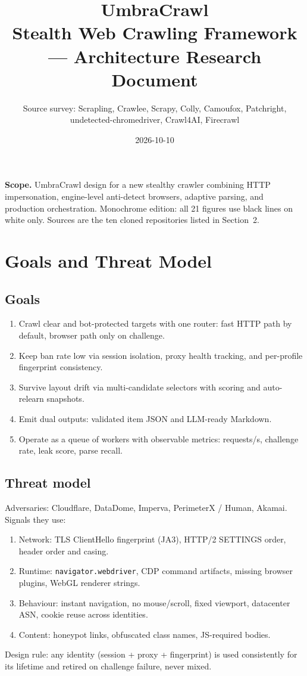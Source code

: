 \documentclass[11pt,a4paper]{article}
\title{UmbraCrawl\\Stealth Web Crawling Framework --- Architecture Research Document}
\author{Source survey: Scrapling, Crawlee, Scrapy, Colly, Camoufox, Patchright, undetected-chromedriver, Crawl4AI, Firecrawl}
\date{2026-10-10}
\begin{document}
\maketitle
\begin{center}
\begin{minipage}{0.92\textwidth}
\small\textbf{Scope.} UmbraCrawl design for a new stealthy crawler combining HTTP impersonation, engine-level anti-detect browsers, adaptive parsing, and production orchestration. Monochrome edition: all 21 figures use black lines on white only. Sources are the ten cloned repositories listed in Section~2.
\end{minipage}
\end{center}
\tableofcontents
\newpage

\section{Goals and Threat Model}
\subsection{Goals}
\begin{enumerate}[leftmargin=*,itemsep=2pt]
\item Crawl clear and bot-protected targets with one router: fast HTTP path by default, browser path only on challenge.
\item Keep ban rate low via session isolation, proxy health tracking, and per-profile fingerprint consistency.
\item Survive layout drift via multi-candidate selectors with scoring and auto-relearn snapshots.
\item Emit dual outputs: validated item JSON and LLM-ready Markdown.
\item Operate as a queue of workers with observable metrics: requests/s, challenge rate, leak score, parse recall.
\end{enumerate}

\subsection{Threat model}
Adversaries: Cloudflare, DataDome, Imperva, PerimeterX / Human, Akamai. Signals they use:
\begin{enumerate}[leftmargin=*,itemsep=2pt]
\item Network: TLS ClientHello fingerprint (JA3), HTTP/2 SETTINGS order, header order and casing.
\item Runtime: \texttt{navigator.webdriver}, CDP command artifacts, missing browser plugins, WebGL renderer strings.
\item Behaviour: instant navigation, no mouse/scroll, fixed viewport, datacenter ASN, cookie reuse across identities.
\item Content: honeypot links, obfuscated class names, JS-required bodies.
\end{enumerate}
Design rule: any identity (session + proxy + fingerprint) is used consistently for its lifetime and retired on challenge failure, never mixed.
\end{document}

